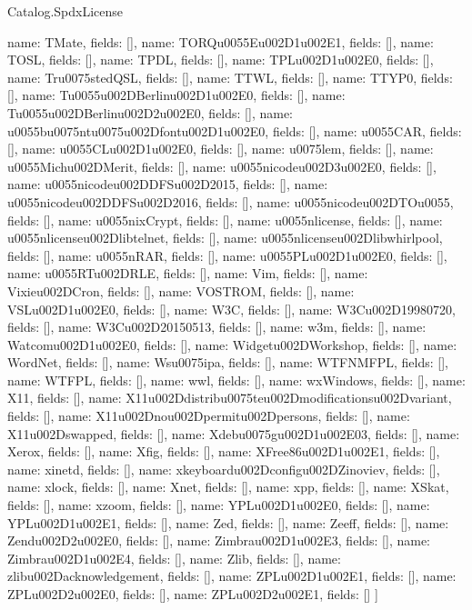 \begin{lexlean}{Catalog.SpdxLicense}
\begin{semanticmodule}
{    {name: TMate, fields: []},
    {name: TORQu0055Eu002D1u002E1, fields: []},
    {name: TOSL, fields: []},
    {name: TPDL, fields: []},
    {name: TPLu002D1u002E0, fields: []},
    {name: Tru0075stedQSL, fields: []},
    {name: TTWL, fields: []},
    {name: TTYP0, fields: []},
    {name: Tu0055u002DBerlinu002D1u002E0, fields: []},
    {name: Tu0055u002DBerlinu002D2u002E0, fields: []},
    {name: u0055bu0075ntu0075u002Dfontu002D1u002E0, fields: []},
    {name: u0055CAR, fields: []},
    {name: u0055CLu002D1u002E0, fields: []},
    {name: u0075lem, fields: []},
    {name: u0055Michu002DMerit, fields: []},
    {name: u0055nicodeu002D3u002E0, fields: []},
    {name: u0055nicodeu002DDFSu002D2015, fields: []},
    {name: u0055nicodeu002DDFSu002D2016, fields: []},
    {name: u0055nicodeu002DTOu0055, fields: []},
    {name: u0055nixCrypt, fields: []},
    {name: u0055nlicense, fields: []},
    {name: u0055nlicenseu002Dlibtelnet, fields: []},
    {name: u0055nlicenseu002Dlibwhirlpool, fields: []},
    {name: u0055nRAR, fields: []},
    {name: u0055PLu002D1u002E0, fields: []},
    {name: u0055RTu002DRLE, fields: []},
    {name: Vim, fields: []},
    {name: Vixieu002DCron, fields: []},
    {name: VOSTROM, fields: []},
    {name: VSLu002D1u002E0, fields: []},
    {name: W3C, fields: []},
    {name: W3Cu002D19980720, fields: []},
    {name: W3Cu002D20150513, fields: []},
    {name: w3m, fields: []},
    {name: Watcomu002D1u002E0, fields: []},
    {name: Widgetu002DWorkshop, fields: []},
    {name: WordNet, fields: []},
    {name: Wsu0075ipa, fields: []},
    {name: WTFNMFPL, fields: []},
    {name: WTFPL, fields: []},
    {name: wwl, fields: []},
    {name: wxWindows, fields: []},
    {name: X11, fields: []},
    {name: X11u002Ddistribu0075teu002Dmodificationsu002Dvariant, fields: []},
    {name: X11u002Dnou002Dpermitu002Dpersons, fields: []},
    {name: X11u002Dswapped, fields: []},
    {name: Xdebu0075gu002D1u002E03, fields: []},
    {name: Xerox, fields: []},
    {name: Xfig, fields: []},
    {name: XFree86u002D1u002E1, fields: []},
    {name: xinetd, fields: []},
    {name: xkeyboardu002Dconfigu002DZinoviev, fields: []},
    {name: xlock, fields: []},
    {name: Xnet, fields: []},
    {name: xpp, fields: []},
    {name: XSkat, fields: []},
    {name: xzoom, fields: []},
    {name: YPLu002D1u002E0, fields: []},
    {name: YPLu002D1u002E1, fields: []},
    {name: Zed, fields: []},
    {name: Zeeff, fields: []},
    {name: Zendu002D2u002E0, fields: []},
    {name: Zimbrau002D1u002E3, fields: []},
    {name: Zimbrau002D1u002E4, fields: []},
    {name: Zlib, fields: []},
    {name: zlibu002Dacknowledgement, fields: []},
    {name: ZPLu002D1u002E1, fields: []},
    {name: ZPLu002D2u002E0, fields: []},
    {name: ZPLu002D2u002E1, fields: []}
  ]
}


\end{semanticmodule}
\end{lexlean}
